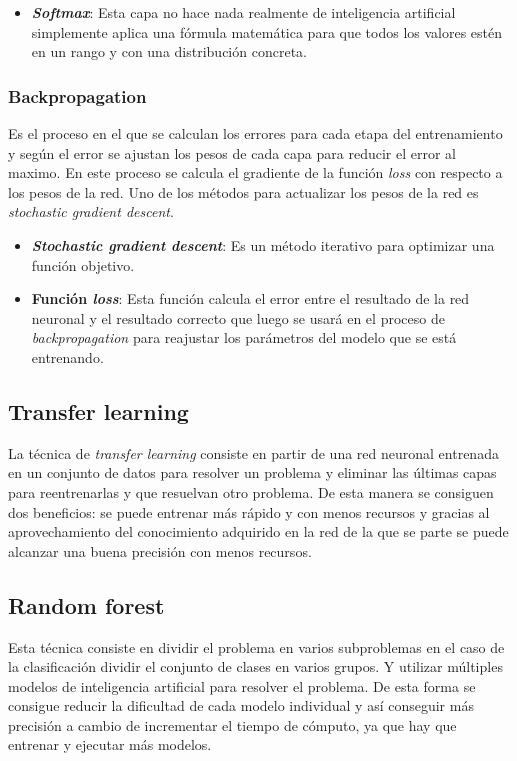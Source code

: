 \documentclass[12pt,a4paper]{article}
\begin{document}
\begin{itemize}
\item \textbf{\textit{Softmax}}: Esta capa no hace nada realmente de inteligencia artificial simplemente aplica una fórmula matemática para que todos los valores estén en un rango y con una distribución concreta.

\end{itemize}

\subsubsection{Backpropagation}
Es el proceso en el que se calculan los errores para cada etapa del entrenamiento y según el error se ajustan los pesos de cada capa para reducir el error al maximo. En este proceso se calcula el gradiente de la función \textit{loss} con respecto a los pesos de la red. Uno de los métodos para actualizar los pesos de la red es \textit{stochastic gradient descent}.

\begin{itemize}
\item \textbf{\textit{Stochastic gradient descent}}: Es un método iterativo para optimizar una función objetivo.

\item \textbf{Función \textit{loss}}: Esta función calcula el error entre el resultado de la red neuronal y el resultado correcto que luego se usará en el proceso de \textit{backpropagation} para reajustar los parámetros del modelo que se está entrenando.

\end{itemize}

\subsection{Transfer learning}
La técnica de \textit{transfer learning} consiste en partir de una red neuronal entrenada en un conjunto de datos para resolver un problema y eliminar las últimas capas para reentrenarlas y que resuelvan otro problema. De esta manera se consiguen dos beneficios: se puede entrenar más rápido y con menos recursos y gracias al aprovechamiento del conocimiento adquirido en la red de la que se parte se puede alcanzar una buena precisión con menos recursos.

\subsection{Random forest}
Esta técnica consiste en dividir el problema en varios subproblemas en el caso de la clasificación dividir el conjunto de clases en varios grupos. Y utilizar múltiples modelos de inteligencia artificial para resolver el problema. De esta forma se consigue reducir la dificultad de cada modelo individual y así conseguir más precisión a cambio de incrementar el tiempo de cómputo, ya que hay que entrenar y ejecutar más modelos.
\end{document}
